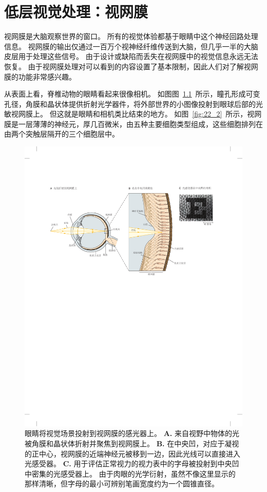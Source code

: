 \chapter{低层视觉处理：视网膜} \label{chap:chap22}

视网膜是大脑观察世界的窗口。
所有的视觉体验都基于眼睛中这个神经回路处理信息。 
视网膜的输出仅通过一百万个视神经纤维传送到大脑，但几乎一半的大脑皮层用于处理这些信号。
由于设计或缺陷而丢失在视网膜中的视觉信息永远无法恢复。
由于视网膜处理对可以看到的内容设置了基本限制，因此人们对了解视网膜的功能非常感兴趣。


从表面上看，脊椎动物的眼睛看起来很像相机。
如图图~\ref{fig:22_1}~所示，瞳孔形成可变孔径，角膜和晶状体提供折射光学器件，将外部世界的小图像投射到眼球后部的光敏视网膜上。
但这就是眼睛和相机类比结束的地方。
如图~\ref{fig:22_2}~所示，视网膜是一层薄薄的神经元，厚几百微米，由五种主要细胞类型组成，这些细胞排列在由两个突触层隔开的三个细胞层中。


\begin{figure}[htbp]
	\centering
	\includegraphics[width=1.0\linewidth]{chap22/fig_22_1}
	\caption{眼睛将视觉场景投射到视网膜的感光器上。
		\textbf{A.} 来自视野中物体的光被角膜和晶状体折射并聚焦到视网膜上。
		\textbf{B.} 在中央凹，对应于凝视的正中心，视网膜的近端神经元被移到一边，因此光线可以直接进入光感受器。
		\textbf{C.} 用于评估正常视力的视力表中的字母被投射到中央凹中密集的光感受器上。
		由于肉眼的光学衍射，虽然不像这里显示的那样清晰，但字母的最小可辨别笔画宽度约为一个圆锥直径\cite{curcio1991organization}。}
	\label{fig:22_1}
\end{figure}


